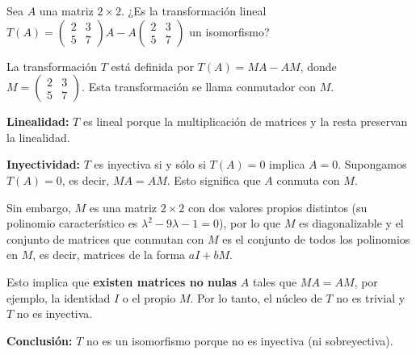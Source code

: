 \begin{prob}
Sea $A$ una matriz $2\times 2.$ ¿Es la transformación lineal $T(A)=\begin{pmatrix} 
2 & 3\\ 
5 & 7 
\end{pmatrix}A - A\begin{pmatrix} 
2 & 3\\ 
5 & 7 
\end{pmatrix}$ un isomorfismo?
\begin{myproof}
La transformación $T$ está definida por $T(A) = MA - AM$, donde $M = \begin{pmatrix} 2 & 3 \\ 5 & 7 \end{pmatrix}$. Esta transformación se llama conmutador con $M$.

\textbf{Linealidad:}  
$T$ es lineal porque la multiplicación de matrices y la resta preservan la linealidad.

\textbf{Inyectividad:}  
$T$ es inyectiva si y sólo si $T(A) = 0$ implica $A = 0$.  
Supongamos $T(A) = 0$, es decir, $MA = AM$. Esto significa que $A$ conmuta con $M$.

Sin embargo, $M$ es una matriz $2\times 2$ con dos valores propios distintos (su polinomio característico es $\lambda^2 - 9\lambda - 1 = 0$), por lo que $M$ es diagonalizable y el conjunto de matrices que conmutan con $M$ es el conjunto de todos los polinomios en $M$, es decir, matrices de la forma $aI + bM$.

Esto implica que \textbf{existen matrices no nulas} $A$ tales que $MA = AM$, por ejemplo, la identidad $I$ o el propio $M$. Por lo tanto, el núcleo de $T$ no es trivial y $T$ no es inyectiva.

\textbf{Conclusión:}  
$T$ no es un isomorfismo porque no es inyectiva (ni sobreyectiva).
\end{myproof}
\end{prob}

